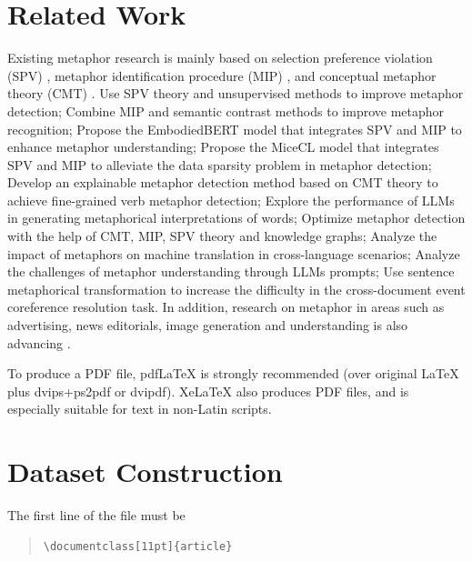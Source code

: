 \documentclass[11pt]{article}
\begin{document}
\section{Related Work}
Existing metaphor research is mainly based on selection preference violation (SPV) \cite{wilks1975preferential,wilks1978making}, metaphor identification procedure (MIP) \cite{group2007mip}, and conceptual metaphor theory (CMT) \cite{Lakoff1980-LAKMWL}. \cite{yang2024can} Use SPV theory and unsupervised methods to improve metaphor detection; \cite{mao2024metapro} Combine MIP and semantic contrast methods to improve metaphor recognition; \cite{li2024embodiedbert} Propose the EmbodiedBERT model that integrates SPV and MIP to enhance metaphor understanding; \cite{jia2024metaphor} Propose the MiceCL model that integrates SPV and MIP to alleviate the data sparsity problem in metaphor detection; \cite{tian2024bridging} Develop an explainable metaphor detection method based on CMT theory to achieve fine-grained verb metaphor detection; \cite{tong2024metaphor} Explore the performance of LLMs in generating metaphorical interpretations of words; \cite{tian2024theory} Optimize metaphor detection with the help of CMT, MIP, SPV theory and knowledge graphs; \cite{wang2024mmte} Analyze the impact of metaphors on machine translation in cross-language scenarios; \cite{chen2024merely} Analyze the challenges of metaphor understanding through LLMs prompts; \cite{ahmed2024generating} Use sentence metaphorical transformation to increase the difficulty in the cross-document event coreference resolution task. In addition, research on metaphor in areas such as advertising, news editorials, image generation and understanding is also advancing \cite{xu2024exploringMetaphor,sengupta2024analyzing,zhang2024gome,zhang2024camel}.

To produce a PDF file, pdf\LaTeX{} is strongly recommended (over original \LaTeX{} plus dvips+ps2pdf or dvipdf). Xe\LaTeX{} also produces PDF files, and is especially suitable for text in non-Latin scripts.

\section{Dataset Construction}

The first line of the file must be
\begin{quote}
\begin{verbatim}
\documentclass[11pt]{article}
\end{verbatim}
\end{quote}
\end{document}
